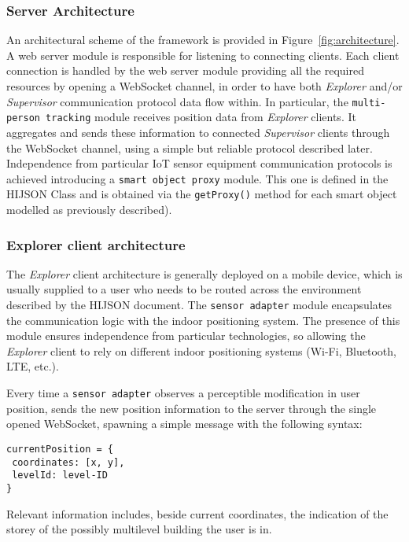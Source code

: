 \subsubsection{Server Architecture}\label{server-architecture}

An architectural scheme of the framework is provided in Figure~\ref{fig:architecture}. A web server module is responsible for listening to
connecting clients. Each client connection is handled by the web server module
providing all the required resources by opening a WebSocket channel, in order to
have both \emph{Explorer} and/or \emph{Supervisor} communication
protocol data flow within. In particular, the \texttt{multi-person\ tracking} module receives
position data from \emph{Explorer} clients. It aggregates and sends these
information to connected \emph{Supervisor} clients through the WebSocket
channel, using a simple but reliable protocol described later. Independence
from particular IoT sensor equipment communication protocols is achieved
introducing a \texttt{smart\ object\ proxy} module. This one is defined in the HIJSON Class
and is obtained via the {\tt getProxy()} method for each smart
object modelled as previously described).

\subsubsection{Explorer client architecture}\label{explorer-client-architecture}

The \emph{Explorer} client architecture is generally deployed on a mobile
device, which is usually supplied to a user who needs to be routed across the
environment described by the HIJSON document. The {\tt sensor\ adapter} module
encapsulates the communication logic with the indoor positioning system. The
presence of this module ensures independence from particular technologies, so
allowing the \emph{Explorer} client to rely on different indoor positioning
systems (Wi-Fi, Bluetooth, LTE, etc.).

Every time a {\tt sensor\ adapter} observes a perceptible
modification in user position, sends the new position information to the
server through the single opened WebSocket, spawning a simple message with the
following syntax:

\begin{verbatim}
currentPosition = {
 coordinates: [x, y],
 levelId: level-ID 
}
\end{verbatim}

Relevant information includes, beside current coordinates, the indication of
the storey of the possibly multilevel building the user is in.

